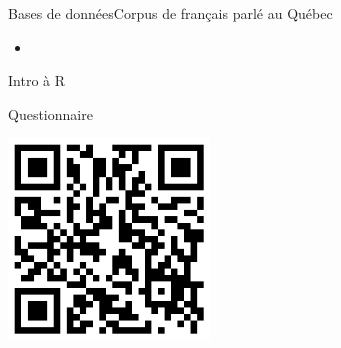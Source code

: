 \documentclass[xcolor=dvipsnames, onlymath, 10pt, aspectratio=169, handout]{beamer}
\begin{document}
\begin{frame}{Bases de données}{Corpus de français parlé au Québec}

	\begin{itemize}
		\item {}
	\end{itemize}

	\begin{center}
	\end{center}

\end{frame}










\begin{transitionframe}


	Intro à R


\end{transitionframe}





\begin{frame}{Questionnaire}{}

	\begin{center}
		\includegraphics[width = 0.4\textwidth]{qr.png}
	\end{center}


\end{frame}
\end{document}
